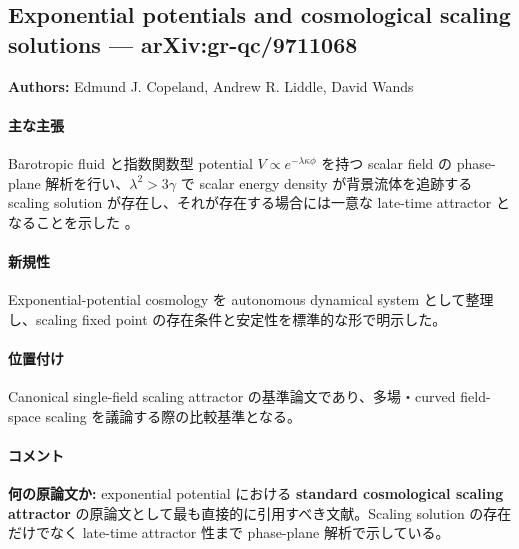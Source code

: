 \subsection{Exponential potentials and cosmological scaling solutions --- arXiv:gr-qc/9711068}

\textbf{Authors:} Edmund J. Copeland, Andrew R. Liddle, David Wands

\paragraph{主な主張}
Barotropic fluid と指数関数型 potential $V\propto e^{-\lambda\kappa\phi}$ を持つ scalar field の phase-plane 解析を行い、$\lambda^2>3\gamma$ で scalar energy density が背景流体を追跡する scaling solution が存在し、それが存在する場合には一意な late-time attractor となることを示した \cite{Copeland:1997scaling}。

\paragraph{新規性}
Exponential-potential cosmology を autonomous dynamical system として整理し、scaling fixed point の存在条件と安定性を標準的な形で明示した。

\paragraph{位置付け}
Canonical single-field scaling attractor の基準論文であり、多場・curved field-space scaling を議論する際の比較基準となる。

\paragraph{コメント}
\textbf{何の原論文か:} exponential potential における \textbf{standard cosmological scaling attractor} の原論文として最も直接的に引用すべき文献。Scaling solution の存在だけでなく late-time attractor 性まで phase-plane 解析で示している。
